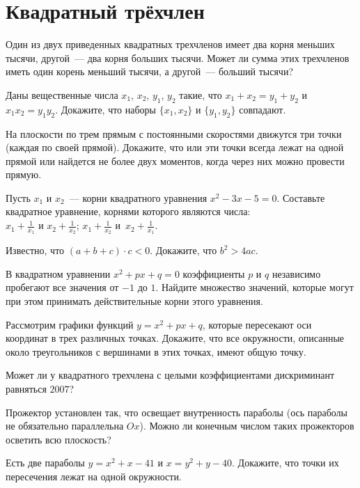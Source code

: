 
\section*{Квадратный трёхчлен}


\begin{problems}

\item
Один из двух приведенных квадратных трехчленов имеет два корня меньших тысячи,
другой~--- два корня больших тысячи.
Может ли сумма этих трехчленов иметь один корень меньший тысячи,
а другой~--- больший тысячи?

\item
Даны вещественные числа $x_1$, $x_2$, $y_1$, $y_2$ такие, что
$x_1 + x_2 = y_1 + y_2$ и $x_1 x_2 = y_1 y_2$.
Докажите, что наборы $\{x_1, x_2\}$ и $\{y_1, y_2\}$ совпадают.

\item
На плоскости по трем прямым с постоянными скоростями движутся три точки
(каждая по своей прямой).
Докажите, что или эти точки всегда лежат на одной прямой или
найдется не более двух моментов,
когда через них можно провести прямую.

\item
Пусть $x_1$ и $x_2$~--- корни квадратного уравнения $x^2 - 3 x - 5 = 0$.
Составьте квадратное уравнение, корнями которого являются числа:
\\
\sp $x_1 + \frac{1}{x_1}$ и $x_2 + \frac{1}{x_2}$;
\qquad
\sp $x_1 + \frac{1}{x_2}$ и~$x_2 + \frac{1}{x_1}$.

\item
Известно, что $(a + b + c) \cdot c < 0$.
Докажите, что $b^2 > 4 a c$.

\item
В квадратном уравнении $x^2 + p x + q = 0$ коэффициенты $p$ и $q$ независимо
пробегают все значения от $-1$ до $1$.
Найдите множество значений, которые могут при этом принимать действительные
корни этого уравнения.

\item
Рассмотрим графики функций $y = x^2 + p x + q$, которые пересекают оси
координат в трех различных точках.
Докажите, что все окружности, описанные около треугольников с вершинами в этих
точках, имеют общую точку.

\item
Может ли у квадратного трехчлена с целыми коэффициентами дискриминант равняться
$2007$?

\item
Прожектор установлен так, что освещает внутренность параболы (ось параболы
не обязательно параллельна $Ox$).
Можно ли конечным числом таких прожекторов осветить всю плоскость?

\item
Есть две параболы $y = x^2 + x - 41$ и $x = y^2 + y - 40$.
Докажите, что точки их пересечения лежат на одной окружности.

\end{problems}


